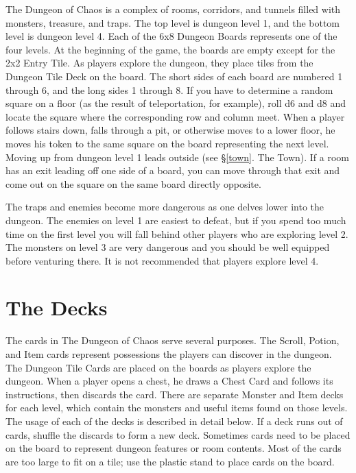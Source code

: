 \documentclass{book}
\begin{document}
The Dungeon of Chaos is a complex of rooms, corridors, and tunnels filled with monsters, treasure, and traps. The top level is dungeon level 1, and the bottom level is dungeon level 4. Each of the 6x8 Dungeon Boards represents one of the four levels. At the beginning of the game, the boards are empty except for the 2x2 Entry Tile. As players explore the dungeon, they place tiles from the Dungeon Tile Deck on the board. The short sides of each board are numbered 1 through 6, and the long sides 1 through 8. If you have to determine a random square on a floor (as the result of teleportation, for example), roll d6 and d8 and locate the square where the corresponding row and column meet. When a player follows stairs down, falls through a pit, or otherwise moves to a lower floor, he moves his token to the same square on the board representing the next level. Moving up from dungeon level 1 leads outside (see §\ref{town}. The Town). If a room has an exit leading off one side of a board, you can move through that exit and come out on the square on the same board directly opposite.

The traps and enemies become more dangerous as one delves lower into the dungeon. The enemies on level 1 are easiest to defeat, but if you spend too much time on the first level you will fall behind other players who are exploring level 2. The monsters on level 3 are very dangerous and you should be well equipped before venturing there. It is not recommended that players explore level 4.  

\section{The Decks}

The cards in The Dungeon of Chaos serve several purposes. The Scroll, Potion, and Item cards represent possessions the players can discover in the dungeon. The Dungeon Tile Cards are placed on the boards as players explore the dungeon. When a player opens a chest, he draws a Chest Card and follows its instructions, then discards the card.  There are separate Monster and Item decks for each level, which contain the monsters and useful items found on those levels. The usage of each of the decks is described in detail below. If a deck runs out of cards, shuffle the discards to form a new deck. Sometimes cards need to be placed on the board to represent dungeon features or room contents. Most of the cards are too large to fit on a tile; use the plastic stand to place cards on the board.
\end{document}
